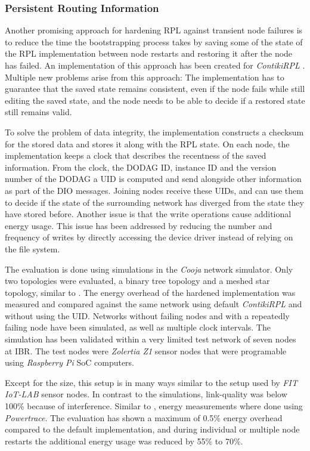 \documentclass[
  a4paper,
  11pt,
  style=screen,
  extramargin,
  bcor=10mm,
  rgb,
  hyperrefdark,
  abstract=off,
  lnum,
]{tubsartcl}
\newcommand{\fitlab}{\emph{FIT IoT-LAB} }
\begin{document}
\subsubsection{Persistent Routing Information}

Another promising approach for hardening \ac{RPL} against transient node failures is to reduce the time the bootstrapping process takes by saving some of the state of the \ac{RPL} implementation between node restarts and restoring it after the node has failed.
An implementation of this approach has been created for \emph{Contiki\ac{RPL}} \cite{mueller2017}.
Multiple new problems arise from this approach: The implementation has to guarantee that the saved state remains consistent, even if the node fails while still editing the saved state, and the node needs to be able to decide if a restored state still remains valid.

To solve the problem of data integrity, the implementation constructs a checksum for the stored data and stores it along with the \ac{RPL} state.
On each node, the implementation keeps a clock that describes the recentness of the saved information.
From the clock, the \ac{DODAG} ID, instance ID and the version number of the \ac{DODAG} a \ac{UID} is computed and send alongside other information as part of the \ac{DIO} messages.
Joining nodes receive these \acp{UID}, and can use them to decide if the state of the surrounding network has diverged from the state they have stored before.
Another issue is that the write operations cause additional energy usage.
This issue has been addressed by reducing the number and frequency of writes by directly accessing the device driver instead of relying on the file system.

The evaluation is done using simulations in the \emph{Cooja} network simulator.
Only two topologies were evaluated, a binary tree topology and a meshed star topology, similar to \cite{kulau2017energy}.
The energy overhead of the hardened implementation was measured and compared against the same network using default \emph{Contiki\ac{RPL}} and without using the UID.
Networks without failing nodes and with a repeatedly failing node have been simulated, as well as multiple clock intervals.
The simulation has been validated within a very limited test network of seven nodes at \ac{IBR}.
The test nodes were \emph{Zolertia Z1} sensor nodes that were programable using \emph{Raspberry Pi} \ac{SoC} computers.

Except for the size, this setup is in many ways similar to the setup used by \fitlab sensor nodes.
In contrast to the simulations, link-quality was below 100\% because of interference.
Similar to \cite{ali2012performance}, energy measurements where done using \emph{Powertrace}.
The evaluation has shown a maximum of 0.5\% energy overhead compared to the default implementation, and during individual or multiple node restarts the additional energy usage was reduced by 55\% to 70\%.
\end{document}
